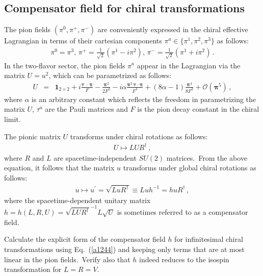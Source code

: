 \documentclass[11pt]{latex/exercise}
\begin{document}
\subsection{Compensator field for chiral transformations}
\noindent
The pion fields $(\pi^0, \pi^+, \pi^-)$ are conveniently expressed in the chiral effective Lagrangian in terms of their cartesian components $\pi^a \in \{ \pi^1, \pi^2, \pi^3\}$ as follows:
\begin{eqnarray}
    \pi^0
    =
    \pi^3
    ,\,
    \pi^+
    =
    \frac{1}{\sqrt{2}} \left( \pi^1 - i  \pi^2 \right)
    ,\,
    \pi^-
    =
    \frac{1}{\sqrt{2}} \left( \pi^1 + i  \pi^2 \right)
    \,.
    \label{PhyIso}
\end{eqnarray}
In the two-flavor sector, the pion fields $\pi^a$ appear in the Lagrangian via the matrix $U = u^2$, which can be parametrized as follows:
\begin{eqnarray}
    U
    &=&
    \mathbf{1}_{2\times 2} + i \frac{\boldsymbol{\tau}\,{\cdot}\,\boldsymbol{\pi}}{F} - \frac{\boldsymbol{\pi}^2}{2 F^2} -  i \alpha \frac{\boldsymbol{\pi}^2 \, \boldsymbol{\tau}{\cdot}{\boldsymbol{\pi}}}{F^3} + (8 \alpha -1)\frac{\boldsymbol{\pi}^4}{8 F^2} + \mathcal{O}(\boldsymbol{\pi}^5)    %
    \label{a1244}
    \,,
\end{eqnarray}
where $\alpha$ is an arbitrary constant which reflects the freedom in parametrizing the matrix $U$, $\tau^a$ are the Pauli matrices and $F$ is the pion decay constant in the chiral limit.~

The pionic matrix $U$ transforms under  chiral rotations as follows:
\begin{eqnarray}
    U
    \mapsto  L U R^\dagger
    \,,
\end{eqnarray}
where $R$ and $L$ are spacetime-independent $SU(2)$ matrices.~From the above equation, it follows that the matrix $u$ transforms under global chiral rotations as follows:
\begin{eqnarray}
    u
    \mapsto  u^\prime = \sqrt{L u R^\dagger} \equiv L u h^{-1} = h u R^\dagger
    \,,
\end{eqnarray}
where the spacetime-dependent unitary matrix $h = h(L, R, U) = \sqrt{L U R^\dagger}^{-1} L \sqrt{U}$ is sometimes referred to as a compensator field.

Calculate the explicit form of the compensator field $h$ for infinitesimal chiral transformations using Eq.~(\ref{a1244}) and keeping only terms that are at most linear in the pion fields.~Verify also that $h$ indeed reduces to the isospin transformation for $L = R = V$.
\end{document}
